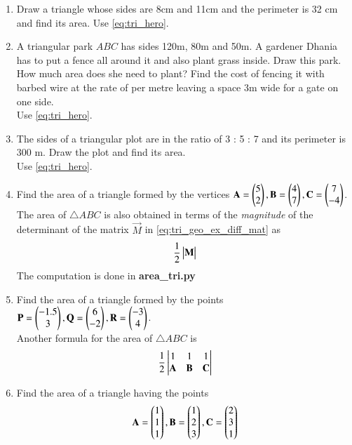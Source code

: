 \begin{enumerate}[label=\arabic*.,ref=\thesubsection.\theenumi]
\item Draw a triangle whose sides are 8cm and 11cm and the perimeter is 32 cm and find its area.
%
\solution Use \eqref{eq:tri_hero}.
%
\item A triangular park $ABC$ has sides 120m, 80m and 50m. A gardener Dhania has to put a fence all around it and also plant grass inside. Draw this park.  How much area does she need to plant? Find the cost of fencing it with barbed wire at the rate of  per metre leaving a space 3m wide for a gate on one side.
\\
\solution Use \eqref{eq:tri_hero}.
%
\item The sides of a triangular plot are in the ratio of 3 : 5 : 7 and its perimeter is 300 m. Draw the plot and find its area.
\\
\solution Use \eqref{eq:tri_hero}.
\item Find the area of a triangle formed by the vertices $\mathbf{A}=\begin{pmatrix}5\\2\end{pmatrix}, \mathbf{B}=\begin{pmatrix}4\\7\end{pmatrix}, \mathbf{C}=\begin{pmatrix}7\\-4\end{pmatrix}$.
\\
\solution  The area of $\triangle ABC$ is also obtained  in terms of the  {\em magnitude} of the determinant of the matrix $\vec{M}$ in  \eqref{eq:tri_geo_ex_diff_mat} as
%
\begin{align}
\frac{1}{2}\begin{vmatrix}\mathbf{M}\end{vmatrix}
\end{align}
The computation is done in \textbf{area\_tri.py}
\item Find the area of a triangle formed by the points $\mathbf{P}=\begin{pmatrix}-1.5\\3\end{pmatrix}, \mathbf{Q}=\begin{pmatrix}6\\-2\end{pmatrix}, \mathbf{R}=\begin{pmatrix}-3\\4\end{pmatrix}$.
\\
\solution Another formula for the area of $\triangle ABC$  is
%
\begin{align}
\frac{1}{2}\begin{vmatrix}1 & 1 & 1\\ \mathbf{A} & \mathbf{B} & \mathbf{C} \end{vmatrix}
\end{align}
%
\item Find the area of a triangle having the points
%
\begin{align}
\vec{A} = \myvec{1\\1 \\1},
\vec{B} = \myvec{1\\2 \\3},
\vec{C} = \myvec{2\\ 3\\1}

\end{align}
\end{enumerate}

